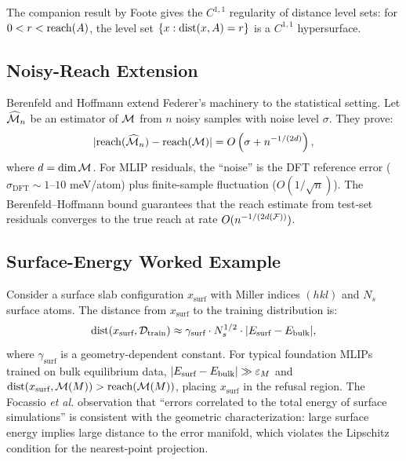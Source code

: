 The companion result by Foote\cite{foote1984regularity} gives the $C^{1,1}$ regularity of distance level sets: for $0 < r < \mathrm{reach}(A)$, the level set $\{x : \mathrm{dist}(x,A) = r\}$ is a $C^{1,1}$ hypersurface.

\subsection{Noisy-Reach Extension}

Berenfeld and Hoffmann\cite{berenfeld2022estimating} extend Federer's machinery to the statistical setting. Let $\widehat{\mathcal{M}}_n$ be an estimator of $\mathcal{M}$ from $n$ noisy samples with noise level $\sigma$. They prove:
\begin{equation}\label{eq:noisy-reach}
    |\mathrm{reach}(\widehat{\mathcal{M}}_n) - \mathrm{reach}(\mathcal{M})| = O\left(\sigma + n^{-1/(2d)}\right),
\end{equation}
where $d = \dim \mathcal{M}$. For MLIP residuals, the ``noise'' is the DFT reference error ($\sigma_{\text{DFT}} \sim 1$--$10$ meV/atom) plus finite-sample fluctuation ($O(1/\sqrt{n})$). The Berenfeld--Hoffmann bound guarantees that the reach estimate from test-set residuals converges to the true reach at rate $O(n^{-1/(2d(\mathcal{F}))})$.

\subsection{Surface-Energy Worked Example}

Consider a surface slab configuration $x_{\text{surf}}$ with Miller indices $(hkl)$ and $N_s$ surface atoms. The distance from $x_{\text{surf}}$ to the training distribution is:
\begin{equation}\label{eq:surf-distance}
    \mathrm{dist}(x_{\text{surf}}, \mathcal{D}_{\text{train}}) \approx \gamma_{\text{surf}} \cdot N_s^{1/2} \cdot |E_{\text{surf}} - E_{\text{bulk}}|,
\end{equation}
where $\gamma_{\text{surf}}$ is a geometry-dependent constant. For typical foundation MLIPs trained on bulk equilibrium data, $|E_{\text{surf}} - E_{\text{bulk}}| \gg \varepsilon_M$ and $\mathrm{dist}(x_{\text{surf}}, \mathcal{M}(M)) > \mathrm{reach}(\mathcal{M}(M))$, placing $x_{\text{surf}}$ in the refusal region. The Focassio \emph{et al.}\cite{focassio2025surfaces} observation that ``errors correlated to the total energy of surface simulations'' is consistent with the geometric characterization: large surface energy implies large distance to the error manifold, which violates the Lipschitz condition for the nearest-point projection.

